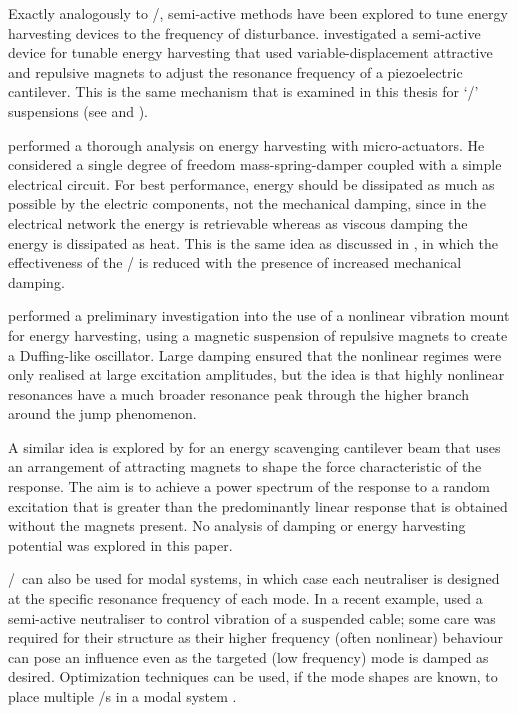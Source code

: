 Exactly analogously to \vibneut/, semi-active methods have been explored to tune energy harvesting devices to the frequency of disturbance.
\textcite{challa2008} investigated a semi-active device for tunable energy harvesting that used variable-displacement attractive and repulsive magnets to adjust the resonance frequency of a piezoelectric cantilever.
This is the same mechanism that is examined in this thesis for `\qzs/' suspensions (see  and ).

\textcite{stephen2006} performed a thorough analysis on energy harvesting with micro-actuators.
He considered a single degree of freedom mass-spring-damper coupled with a simple electrical circuit.
For best performance, energy should be dissipated as much as possible by the electric components, not the mechanical damping, since in the electrical network the energy is retrievable whereas as viscous damping the energy is dissipated as heat.
This is the same idea as discussed in , in which the effectiveness of the \vibneut/ is reduced with the presence of increased mechanical damping.

\textcite{mann2008} performed a preliminary investigation into the use of a
nonlinear vibration mount for energy harvesting, using a magnetic suspension
of repulsive magnets to create a Duffing-like oscillator.
Large damping
ensured that the nonlinear regimes were only realised at large excitation
amplitudes, but the idea is that highly nonlinear resonances have a much
broader resonance peak through the higher branch around the jump phenomenon.

A similar idea is explored by \textcite{shahruz2008} for an energy scavenging
cantilever beam that uses an arrangement of attracting magnets to shape the
force characteristic of the response.
The aim is to achieve a power spectrum
of the response to a random excitation that is greater than the predominantly
linear response that is obtained without the magnets present.
No analysis of 
damping or energy harvesting potential was explored in this paper.

\Vibneut/\ can also be used for modal systems, in which case each
neutraliser is designed at the specific resonance frequency of each mode.
In a
recent example, \textcite{casciati2007} used a semi-active neutraliser to
control vibration of a suspended cable; some care was required for their
structure as their higher frequency (often nonlinear) behaviour can pose an
influence even as the targeted (low frequency) mode is damped as desired.
Optimization techniques can be used, if the mode shapes are known, to place
multiple \vibneut/s in a modal system \cite{petit2009}.

